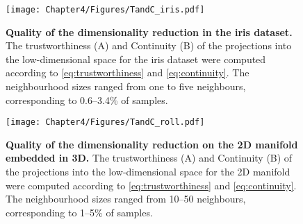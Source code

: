 \begin{figure}[hbtp]
	\centering
	\texttt{[image: Chapter4/Figures/TandC\_iris.pdf]}
	\caption[\textbf{Quality of the dimensionality reduction in the iris dataset.}]{\textbf{Quality of the dimensionality reduction in the iris dataset.} The trustworthiness (A)  and Continuity (B) of the projections into the low-dimensional space for the iris dataset were computed according to \cref{eq:trustworthiness} and \cref{eq:continuity}. The neighbourhood sizes ranged from one to five neighbours, corresponding to \numrange{0.6}{3.4}\% of samples.}
	 	\label{fig:TandC-iris}
\end{figure}


\begin{figure}[hbtp]
	\centering
	\texttt{[image: Chapter4/Figures/TandC\_roll.pdf]}
	\caption[\textbf{Quality of the dimensionality reduction on the 2D manifold embedded in 3D.}]{\textbf{Quality of the dimensionality reduction on the 2D manifold embedded in 3D.} The trustworthiness (A)  and Continuity (B) of the projections into the low-dimensional space for the 2D manifold were computed according to \cref{eq:trustworthiness} and \cref{eq:continuity}. The neighbourhood sizes ranged from \numrange{10}{50} neighbours, corresponding to \numrange{1}{5}\% of samples.} 
	 	\label{fig:dimRed-roll}
\end{figure}

